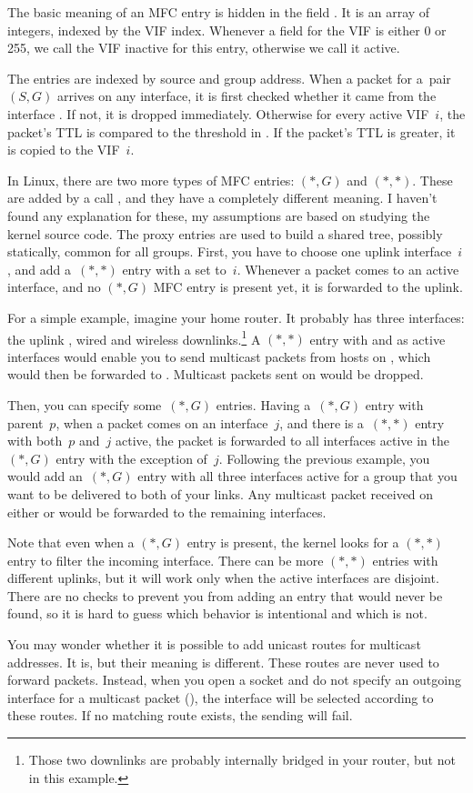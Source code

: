 \noindent The basic meaning of an MFC entry is hidden in the field . It is
an array of  integers, indexed by the VIF index. Whenever a field for the VIF is
either 0 or 255, we call the VIF inactive for this entry, otherwise we call it
active.

The entries are indexed by source and group address. When a packet for a~pair $(S,G)$
arrives on any interface, it is first checked whether it came from the
interface . If not, it is dropped immediately. Otherwise
for every active VIF~$i$, the packet's TTL is compared to the threshold in
. If the packet's TTL is greater, it is copied to the
VIF~$i$.

In Linux, there are two more types of MFC entries: $(*,G)$ and $(*,*)$. These
are added by a call , and they have a completely different
meaning. I haven't found any explanation for these, my assumptions are based on
studying the kernel source code. The proxy entries are used to build a shared
tree, possibly statically, common for all groups. First, you have to choose one
uplink interface~$i$, and add a~$(*,*)$ entry with a  set
to~$i$. Whenever a packet comes to an active interface, and no $(*, G)$ MFC
entry is present yet, it is forwarded to the uplink.

For a simple example, imagine your home router. It probably has three
interfaces: the uplink , wired  and wireless
 downlinks.\footnote{Those two downlinks are probably internally
bridged in your router, but not in this example.} A $(*,*)$ entry with
 and  as active interfaces would enable you to send
multicast packets from hosts on , which would then be forwarded to
. Multicast packets sent on  would be dropped.

Then, you can specify some~$(*,G)$ entries. Having a~$(*,G)$ entry with parent~$p$,
when a packet comes on an interface~$j$, and there is a~$(*,*)$ entry with
both~$p$ and~$j$ active, the packet is forwarded to all interfaces active in
the~$(*,G)$ entry with the exception of~$j$. Following the previous example,
you would add an~$(*,G)$ entry with all three interfaces active for a group
that you want to be delivered to both of your links. Any multicast packet
received on either  or  would be forwarded to the
remaining interfaces.

Note that even when a $(*,G)$ entry is present, the kernel looks for a $(*,*)$
entry to filter the incoming interface. There can be more $(*,*)$ entries with
different uplinks, but it will work only when the active interfaces are
disjoint. There are no checks to prevent you from adding an entry that would
never be found, so it is hard to guess which behavior is intentional and which
is not.

You may wonder whether it is possible to add unicast routes for multicast
addresses. It is, but their meaning is different. These routes are never used
to forward packets. Instead, when you open a socket and do not specify an
outgoing interface for a multicast packet (), the interface
will be selected according to these routes. If no matching route exists, the sending
will fail.
